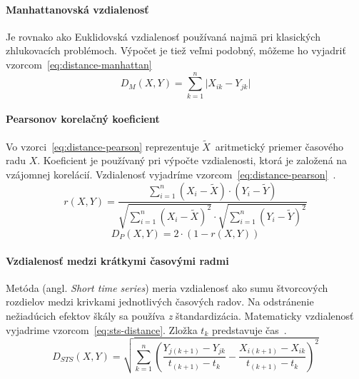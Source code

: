 \documentclass[a4paper,twoside,slovak,12pt,appendix]{article}
\begin{document}
\paragraph{Manhattanovská vzdialenosť}
Je rovnako ako Euklidovská vzdialenosť používaná najmä pri klasických
zhlukovacích problémoch. Výpočet je tiež veľmi podobný, môžeme ho vyjadriť
vzorcom~\ref{eq:distance-manhattan}
\begin{equation}
	\label{eq:distance-manhattan}
  D_M \left( X, Y \right) = \sum_{k=1}^{n} \lvert X_{ik} - Y_{jk} \rvert
\end{equation}

\paragraph{Pearsonov korelačný koeficient}
Vo vzorci~\ref{eq:distance-pearson} reprezentuje $\widetilde{X}$~aritmetický
priemer časového radu $X$. Koeficient je používaný pri výpočte vzdialenosti,
ktorá je založená na vzájomnej korelácií. Vzdialenosť vyjadríme
vzorcom~\ref{eq:distance-pearson}~\cite{WarrenLiao2005}.
\begin{equation}
	\label{eq:distance-pearson}
  r \left( X, Y \right) = \frac
  { \sum_{i=1}^{n} \left( X_{i} - \widetilde{X} \right) \cdot \left( Y_{i} - \widetilde{Y} \right) }
  { \sqrt{\sum_{i=1}^{n} \left( X_{i} - \widetilde{X} \right)^2 } \cdot \sqrt{\sum_{i=1}^{n} \left( Y_{i} - \widetilde{Y} \right)^2 } }
\end{equation}
\begin{equation}
	\label{eq:distance-golay}
  D_P \left( X, Y \right) = 2 \cdot \left( 1 - r \left( X, Y \right) \right)
\end{equation}

\paragraph{Vzdialenosť medzi krátkymi časovými radmi}
Metóda (angl. \textit{Short time series}) meria vzdialenosť ako sumu štvorcových
rozdielov medzi krivkami jednotlivých časových radov. Na odstránenie nežiadúcich
efektov škály sa používa \textit{z} štandardizácia. Matematicky vzdialenosť
vyjadrime vzorcom~\ref{eq:sts-distance}. Zložka $t_k$ predstavuje
čas~\cite{WarrenLiao2005}.
\begin{equation}
	\label{eq:sts-distance}
  D_{STS} \left( X, Y \right) = \sqrt{ \sum_{k=1}^{n} \left(
    \frac{Y_{j \left( k+1 \right)} - Y_{jk}}{t_{\left( k+1 \right)} - t_k} -
    \frac{X_{i \left( k+1 \right)} - X_{ik}}{t_{\left( k+1 \right)} - t_k}
   \right)^2 }
\end{equation}
\end{document}
